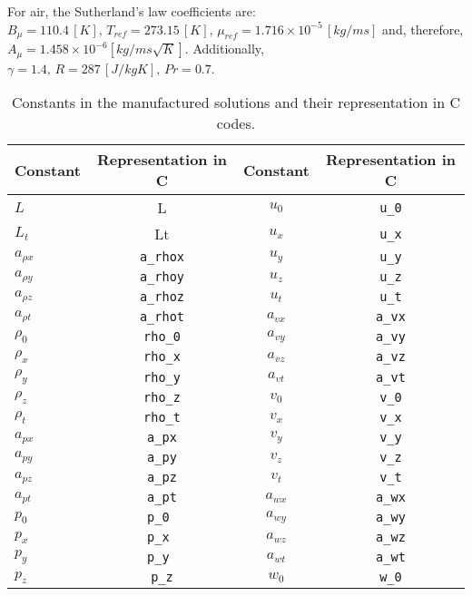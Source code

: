 \documentclass[10pt]{article}
\begin{document}
For air, the Sutherland's law coefficients are: $B_\mu   = 110.4 \, [K], \, T_{ref} = 273.15 \, [K],  \, \mu_{ref} = 1.716\times 10^{-5}\, [kg/ms]$ and, therefore, $A_\mu=1.458\times 10^{-6} [kg /ms\sqrt{K}]$. Additionally, $\gamma  = 1.4 ,\, R = 287 \, [J/kg K],\, Pr  = 0.7$. 
\begin{table}[hptb]
\caption{Constants in the manufactured solutions and their representation in C codes.}
\centering
\begin{tabular}{l c | c c}
\hline\hline
 Constant     & Representation in C &  Constant     & Representation in C \\ [0.25ex]
\hline 
$L$			  & L	   				&  $ u_{0}$ 	& \texttt{u\_0}   \\ 
$ L_{t}$ 	  & Lt	   				&  $ u_{x}$ 	& \texttt{u\_x}   \\
$ a_{\rho x}$ & \texttt{a\_rhox}	&  $ u_{y}$ 	& \texttt{u\_y}   \\ 
$ a_{\rho y}$ & \texttt{a\_rhoy}	&  $ u_{z}$ 	& \texttt{u\_z}   \\
$ a_{\rho z}$ & \texttt{a\_rhoz}	&  $ u_{t}$ 	& \texttt{u\_t}   \\ 
$ a_{\rho t}$ & \texttt{a\_rhot}	&  $ a_{vx}$ 	& \texttt{a\_vx}   \\
$ \rho_{0}$   & \texttt{rho\_0}   	&  $ a_{vy}$ 	& \texttt{a\_vy}   \\
$ \rho_{x}$   & \texttt{rho\_x}   	&  $ a_{vz}$ 	& \texttt{a\_vz}   \\ 
$ \rho_{y}$   & \texttt{rho\_y}   	&  $ a_{vt}$ 	& \texttt{a\_vt}   \\
$ \rho_{z}$   & \texttt{rho\_z}   	&  $ v_{0}$ 	& \texttt{v\_0}   \\ 
$ \rho_{t}$   & \texttt{rho\_t}   	&  $ v_{x}$ 	& \texttt{v\_x}   \\ 
$ a_{px}$ 	  & \texttt{a\_px}   	&  $ v_{y}$		& \texttt{v\_y}   \\ 
$ a_{py}$ 	  &	\texttt{a\_py}   	&  $ v_{z}$		& \texttt{v\_z}   \\
$ a_{pz}$     & \texttt{a\_pz}   	&  $ v_{t}$		& \texttt{v\_t}   \\ 
$ a_{pt}$ 	  & \texttt{a\_pt}   	&  $ a_{wx}$	& \texttt{a\_wx}   \\
$ p_{0}$ 	  & \texttt{p\_0 }  	&  $ a_{wy}$	& \texttt{a\_wy}   \\
$ p_{x}$ 	  & \texttt{p\_x }  	&  $ a_{wz}$	& \texttt{a\_wz}   \\
$ p_{y}$      &	\texttt{p\_y }  	&  $ a_{wt}$	& \texttt{a\_wt}   \\
$ p_{z}$      & \texttt{p\_z}   	&  $ w_{0}$ 	& \texttt{w\_0}   \\

\end{tabular}
\end{table}
\end{document}
